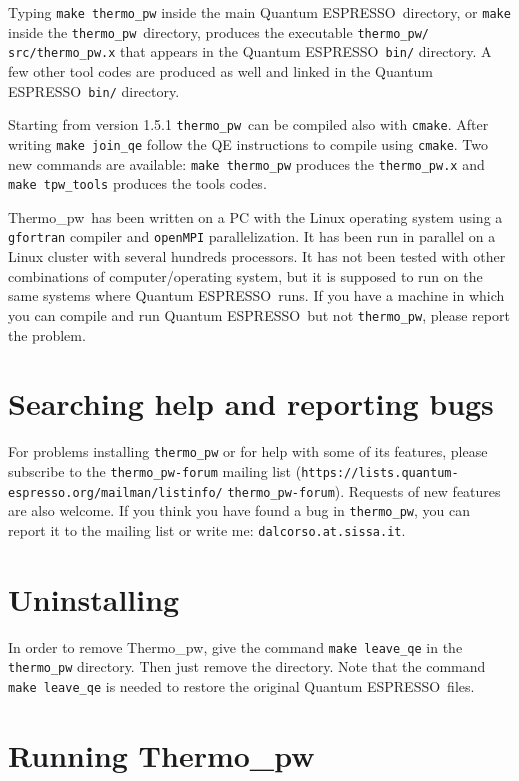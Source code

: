 \documentclass[12pt,a4paper,twoside]{report}
\def\qe{{\sc Quantum ESPRESSO}}
\def\thermo{{\sc Thermo\_pw}}
\begin{document}
Typing \texttt{make thermo\_pw} inside the main \qe\ directory, 
or \texttt{make} 
inside the \texttt{thermo\_pw}\ directory, produces the executable
\texttt{thermo\_pw/} \texttt{src/thermo\_pw.x} that appears in the 
\qe\ \texttt{bin/} directory. A few other tool codes are produced as well
and linked in the \qe\ \texttt{bin/} directory.

Starting from version 1.5.1 \texttt{thermo\_pw}\ can be compiled also
with \texttt{cmake}. After writing \texttt{make join\_qe} follow the 
QE instructions to compile using \texttt{cmake}. Two new commands are
available: \texttt{make thermo\_pw} produces the \texttt{thermo\_pw.x}  
and \texttt{make tpw\_tools} produces the tools codes.

\thermo\ has been written on a PC with the Linux operating system using a
\texttt{gfortran} compiler and \texttt{openMPI} parallelization. It has
been run in parallel on a Linux cluster with several hundreds processors.
It has not been tested with other combinations of computer/operating system, 
but it is supposed to run on the same systems where \qe\ runs. If
you have a machine in which you can compile and run \qe\ but not 
\texttt{thermo\_pw}, please report the problem.

\newpage
{\color{coral}\section{Searching help and reporting bugs}}
\color{black}
For problems installing \texttt{thermo\_pw} or for help
with some of its features, please subscribe to the \texttt{thermo\_pw-forum}
mailing list 
(\texttt{https://lists.quantum-} \texttt{espresso.org/mailman/listinfo/}
\texttt{thermo\_pw-forum}). 
Requests of new features are also welcome. If you think you have
found a bug 
in \texttt{thermo\_pw}, you can report it to the mailing list or 
write me: \texttt{dalcorso.at.sissa.it}.

\newpage
{\color{coral}\section{Uninstalling}}
\color{black}

In order to remove \thermo, give the command \texttt{make leave\_qe} in the
\texttt{thermo\_pw} directory. Then just remove the directory. Note that 
the command \texttt{make leave\_qe} is needed to restore the original \qe\ files.

\newpage
{\color{coral}\section{Running \thermo}}
\color{black}
\end{document}
